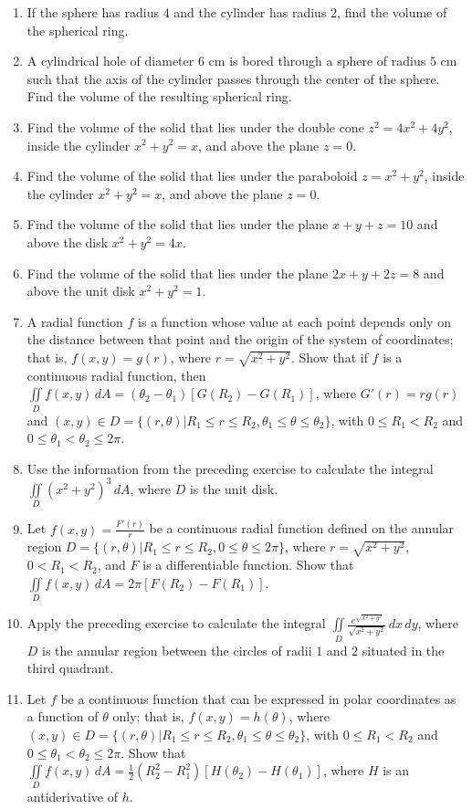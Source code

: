 \documentclass{exercises}
\begin{document}
\begin{enumerate}[resume]
\item If the sphere has radius $4$ and the cylinder has radius $2$, find the volume of the spherical ring.
\item A cylindrical hole of diameter $6$ cm is bored through a sphere of radius $5$ cm such that the axis of the cylinder passes through the center of the sphere. Find the volume of the resulting spherical ring.
\item Find the volume of the solid that lies under the double cone $z^{2}=4x^{2}+4y^{2}$, inside the cylinder $x^{2}+y^{2}=x$, and above the plane $z=0$.
\item Find the volume of the solid that lies under the paraboloid $z=x^{2}+y^{2}$, inside the cylinder $x^{2}+y^{2}=x$, and above the plane $z=0$.
\item Find the volume of the solid that lies under the plane $x+y+z=10$ and above the disk $x^{2}+y^{2}=4x$.
\item Find the volume of the solid that lies under the plane $2x+y+2z=8$ and above the unit disk $x^{2}+y^{2}=1$.
\item A radial function $f$ is a function whose value at each point depends only on the distance between that point and the origin of the system of coordinates; that is, $f(x,y)=g(r)$, where $r=\sqrt{x^{2}+y^{2}}$. Show that if $f$ is a continuous radial function, then $\underset{D}{\iint}f(x,y)\,dA=(\theta_{2}-\theta_{1})[G(R_{2})-G(R_{1})]$, where $G'(r)=rg(r)$ and $(x,y)\in D=\{(r,\theta)|R_{1}\le r\le R_{2},\theta_{1}\le \theta \le \theta_{2}\}$, with $0\le R_{1}<R_{2}$ and $0\le \theta_{1}<\theta_{2}\le2\pi$.
\item Use the information from the preceding exercise to calculate the integral $\underset{D}{\iint}{(x^{2}+y^{2})}^{3}\,dA$, where $D$ is the unit disk.
\item Let $f(x,y)=\frac{F'(r)}{r}$ be a continuous radial function defined on the annular region $D=\{(r,\theta)|R_{1}\le r\le R_{2},0\le \theta \le2\pi \}$, where $r=\sqrt{x^{2}+y^{2}}$, $0<R_{1}<R_{2}$, and $F$ is a differentiable function. Show that $\underset{D}{\iint}f(x,y)\,dA=2\pi[F(R_{2})-F(R_{1})]$.
\item Apply the preceding exercise to calculate the integral $\underset{D}{\iint}\frac{e^{\sqrt{x^{2}+y^{2}}}}{\sqrt{x^{2}+y^{2}}}\,dx\,dy$, where $D$ is the annular region between the circles of radii $1$ and $2$ situated in the third quadrant.
\item Let $f$ be a continuous function that can be expressed in polar coordinates as a function of $\theta$ only; that is, $f(x,y)=h(\theta)$, where $(x,y)\in D=\{(r,\theta)|R_{1}\le r\le R_{2},\theta_{1}\le \theta \le \theta_{2}\}$, with $0\le R_{1}<R_{2}$ and $0\le \theta_{1}<\theta_{2}\le2\pi$. Show that $\underset{D}{\iint}f(x,y)\,dA=\frac{1}{2}(R_{2}^{2}-R_{1}^{2})[H(\theta_{2})-H(\theta_{1})]$, where $H$ is an antiderivative of $h$.

\end{enumerate}
\end{document}
